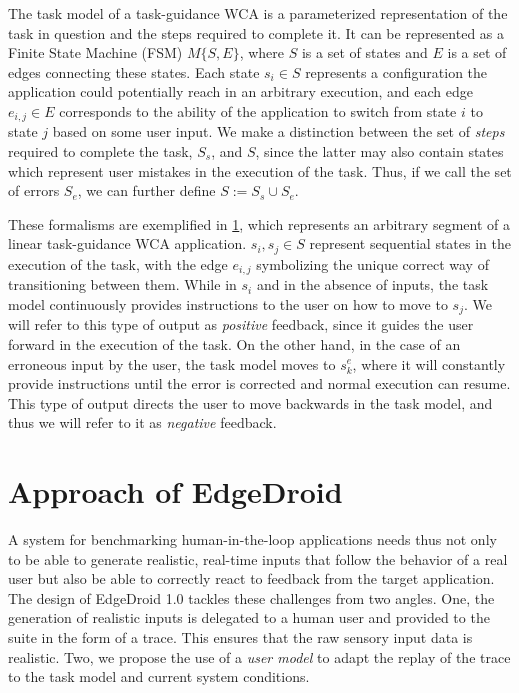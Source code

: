 The task model of a task-guidance WCA is a parameterized representation of the task in question and the steps required to complete it.
It can be represented as a Finite State Machine (FSM) \( M\{S, E\} \), where \(S\) is a set of states and \(E\) is a set of edges connecting these states.
Each state \(s_i \in S\) represents a configuration the application could potentially reach in an arbitrary execution, and each edge \(e_{i,j} \in E\) corresponds to the ability of the application to switch from state \(i\) to state \(j\) based on some user input.
We make a distinction between the set of \emph{steps} required to complete the task, \(S_s\), and \(S\), since the latter may also contain states which represent user mistakes in the execution of the task.
Thus, if we call the set of errors \(S_e\), we can further define \(S := S_s \cup S_e\).

\begin{figure}[tb]
    \centering
    
    \label{fig:taskmodel}
\end{figure}

These formalisms are exemplified in \cref{fig:taskmodel}, which represents an arbitrary segment of a linear task-guidance WCA application.
\(s_{i}, s_{j} \in S\) represent sequential states in the execution of the task, with the edge \(e_{i,j}\) symbolizing the unique correct way of transitioning between them.
While in \(s_i\) and in the absence of inputs, the task model continuously provides instructions to the user on how to move to \(s_j\).
We will refer to this type of output as \emph{positive} feedback, since it guides the user forward in the execution of the task.
On the other hand, in the case of an erroneous input by the user, the task model moves to \(s^{e}_{k}\), where it will constantly provide instructions until the error is corrected and normal execution can resume.
This type of output directs the user to move backwards in the task model, and thus we will refer to it as \emph{negative} feedback.

\section{Approach of EdgeDroid}\label{sec:approach}

A system for benchmarking human-in-the-loop applications needs thus not only to be able to generate realistic, real-time inputs that follow the behavior of a real user but also be able to correctly react to feedback from the target application.
The design of EdgeDroid 1.0 tackles these challenges from two angles.
One, the generation of realistic inputs is delegated to a human user and provided to the suite in the form of a trace.
This ensures that the raw sensory input data is realistic.
Two, we propose the use of a \emph{user model} to adapt the replay of the trace to the task model and current system conditions.

